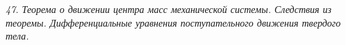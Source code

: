 \emph{47. Теорема о движении центра масс механической системы. Следствия из
теоремы. Дифференциальные уравнения поступательного движения твердого
тела.}

\newpage
